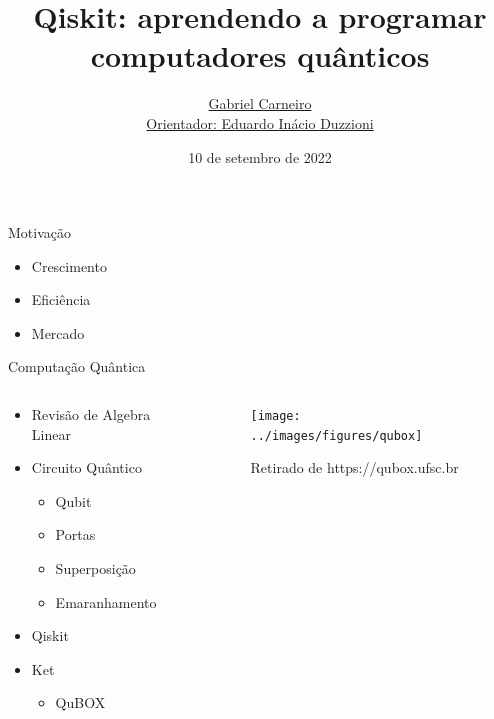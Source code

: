 \documentclass[
    12pt,
    xcolor={svgnames},
]{beamer}
\title{Qiskit: aprendendo a programar computadores quânticos}
\author{\href{https://github.com/G-Carneiro}{Gabriel Carneiro \\
Orientador: Eduardo Inácio Duzzioni}}
\date{10 de setembro de 2022}
\begin{document}
    \begin{frame}[plain]
        \titlepage
    \end{frame}

    \begin{frame}{Motivação}
        \begin{itemize}
            \item Crescimento
            \item Eficiência
            \item Mercado
        \end{itemize}
    \end{frame}

    \begin{frame}{Computação Quântica}
        \begin{columns}
            \begin{column}{0.5\textwidth}
            \begin{itemize}
                \item Revisão de Algebra Linear
                \item Circuito Quântico
                    \begin{itemize}
                        \item Qubit
                        \item Portas
                        \item Superposição
                        \item Emaranhamento
                    \end{itemize}
                \item Qiskit
                \item Ket
                    \begin{itemize}
                        \item QuBOX
                    \end{itemize}
            \end{itemize}
            \end{column}
            \begin{column}{0.5\textwidth}
                \begin{figure}
                    \texttt{[image: ../images/figures/qubox]}
                    \caption{Retirado de https://qubox.ufsc.br}
                    \label{fig:qubox}
                \end{figure}
            \end{column}
        \end{columns}
    \end{frame}
\end{document}
